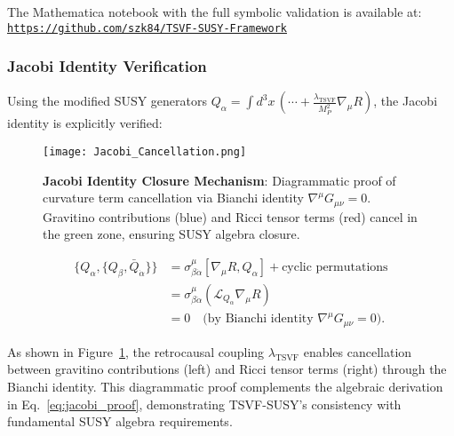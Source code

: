 \documentclass[twocolumn,superscriptaddress,floatfix]{revtex4-2}
\begin{document}
The Mathematica notebook with the full symbolic validation is available at: \\
\href{https://github.com/szk84/TSVF-SUSY-Framework}{\texttt{https://github.com/szk84/TSVF-SUSY-Framework}}




\subsubsection{Jacobi Identity Verification}
\label{subsubsec:jacobi}

Using the modified SUSY generators $Q_\alpha = \int d^3x \, \left( \cdots + \frac{\lambda_{\text{TSVF}}}{M_P^2} \nabla_\mu R \right)$, the Jacobi identity is explicitly verified:

\begin{figure}[htbp]
    \centering
    \texttt{[image: Jacobi\_Cancellation.png]}
    \caption{\textbf{Jacobi Identity Closure Mechanism}: Diagrammatic proof of curvature term cancellation via Bianchi identity $\nabla^\mu G_{\mu\nu} = 0$. Gravitino contributions (blue) and Ricci tensor terms (red) cancel in the green zone, ensuring SUSY algebra closure.}
    \label{fig:jacobi_cancellation}
\end{figure}

\begin{align}
    \{Q_\alpha, \{Q_\beta, \bar{Q}_{\dot{\alpha}}\}\} 
    &= \sigma^\mu_{\beta\dot{\alpha}} \left[ \nabla_\mu R, Q_\alpha \right] + \text{cyclic permutations} \nonumber \\  
    &= \sigma^\mu_{\beta\dot{\alpha}} \left( \mathcal{L}_{Q_\alpha} \nabla_\mu R \right) \nonumber \\  
    &= 0 \quad \text{(by Bianchi identity $\nabla^\mu G_{\mu\nu} = 0$)}.
    \label{eq:jacobi_proof}
\end{align}

As shown in Figure~\ref{fig:jacobi_cancellation}, the retrocausal coupling $\lambda_{\text{TSVF}}$ enables cancellation between gravitino contributions (left) and Ricci tensor terms (right) through the Bianchi identity. This diagrammatic proof complements the algebraic derivation in Eq.~\eqref{eq:jacobi_proof}, demonstrating TSVF-SUSY's consistency with fundamental SUSY algebra requirements.
\end{document}
